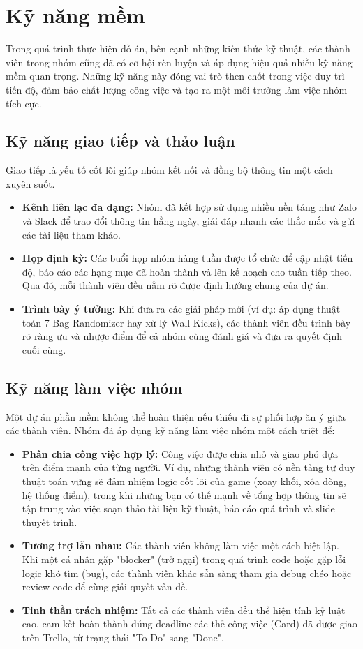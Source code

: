 \section{Kỹ năng mềm}

Trong quá trình thực hiện đồ án, bên cạnh những kiến thức kỹ thuật, các thành viên trong nhóm cũng đã có cơ hội rèn luyện và áp dụng hiệu quả nhiều kỹ năng mềm quan trọng. Những kỹ năng này đóng vai trò then chốt trong việc duy trì tiến độ, đảm bảo chất lượng công việc và tạo ra một môi trường làm việc nhóm tích cực.

\subsection{Kỹ năng giao tiếp và thảo luận}
Giao tiếp là yếu tố cốt lõi giúp nhóm kết nối và đồng bộ thông tin một cách xuyên suốt.
\begin{itemize}
    \item \textbf{Kênh liên lạc đa dạng:} Nhóm đã kết hợp sử dụng nhiều nền tảng như Zalo và Slack để trao đổi thông tin hằng ngày, giải đáp nhanh các thắc mắc và gửi các tài liệu tham khảo. 
    \item \textbf{Họp định kỳ:} Các buổi họp nhóm hàng tuần được tổ chức để cập nhật tiến độ, báo cáo các hạng mục đã hoàn thành và lên kế hoạch cho tuần tiếp theo. Qua đó, mỗi thành viên đều nắm rõ được định hướng chung của dự án.
    \item \textbf{Trình bày ý tưởng:} Khi đưa ra các giải pháp mới (ví dụ: áp dụng thuật toán 7-Bag Randomizer hay xử lý Wall Kicks), các thành viên đều trình bày rõ ràng ưu và nhược điểm để cả nhóm cùng đánh giá và đưa ra quyết định cuối cùng.
\end{itemize}

\subsection{Kỹ năng làm việc nhóm}
Một dự án phần mềm không thể hoàn thiện nếu thiếu đi sự phối hợp ăn ý giữa các thành viên. Nhóm đã áp dụng kỹ năng làm việc nhóm một cách triệt để:
\begin{itemize}
    \item \textbf{Phân chia công việc hợp lý:} Công việc được chia nhỏ và giao phó dựa trên điểm mạnh của từng người. Ví dụ, những thành viên có nền tảng tư duy thuật toán vững sẽ đảm nhiệm logic cốt lõi của game (xoay khối, xóa dòng, hệ thống điểm), trong khi những bạn có thế mạnh về tổng hợp thông tin sẽ tập trung vào việc soạn thảo tài liệu kỹ thuật, báo cáo quá trình và slide thuyết trình.
    \item \textbf{Tương trợ lẫn nhau:} Các thành viên không làm việc một cách biệt lập. Khi một cá nhân gặp "blocker" (trở ngại) trong quá trình code hoặc gặp lỗi logic khó tìm (bug), các thành viên khác sẵn sàng tham gia debug chéo hoặc review code để cùng giải quyết vấn đề.
    \item \textbf{Tinh thần trách nhiệm:} Tất cả các thành viên đều thể hiện tính kỷ luật cao, cam kết hoàn thành đúng deadline các thẻ công việc (Card) đã được giao trên Trello, từ trạng thái "To Do" sang "Done".
\end{itemize}

